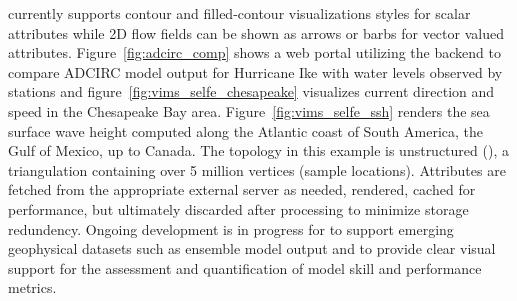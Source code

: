 \sciwms{} currently supports contour and filled-contour visualizations
styles for scalar attributes while 2D flow fields can be shown as
arrows or barbs for vector valued
attributes. Figure~\ref{fig:adcirc_comp} shows a web portal utilizing
the \sciwms{} backend to compare ADCIRC model output for Hurricane Ike
with water levels observed by \noaa{} stations and
figure~\ref{fig:vims_selfe_chesapeake} visualizes current direction
and speed in the Chesapeake Bay area. Figure~\ref{fig:vims_selfe_ssh}
renders the sea surface wave height computed along the Atlantic coast
of South America, the Gulf of Mexico, up to Canada. The topology in
this example is unstructured (\ugrid{}), a triangulation containing
over 5 million vertices (sample locations). Attributes are fetched
from the appropriate external server as needed, rendered, cached for
performance, but ultimately discarded after processing to minimize
storage redundency. Ongoing development is in progress for \sciwms{}
to support emerging geophysical datasets such as ensemble model output
and to provide clear visual support for the assessment and
quantification of model skill and performance metrics.
